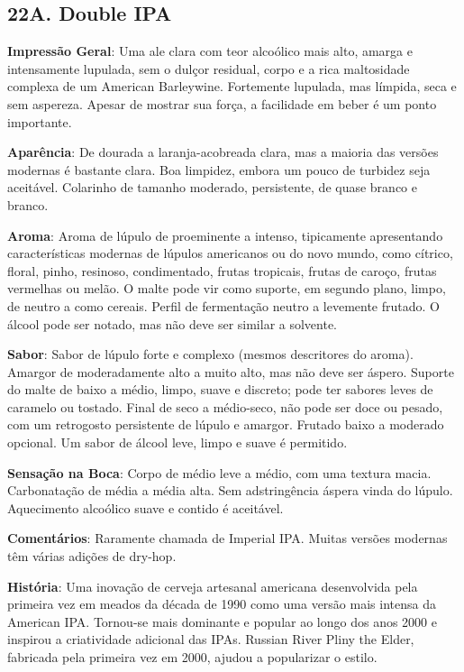 \subsection*{22A. Double IPA}
\textbf{Impressão Geral}: Uma ale clara com teor alcoólico mais alto, amarga e intensamente lupulada, sem o dulçor residual, corpo e a rica maltosidade complexa de um American Barleywine. Fortemente lupulada, mas límpida, seca e sem aspereza. Apesar de mostrar sua força, a facilidade em beber é um ponto importante.

\textbf{Aparência}: De dourada a laranja-acobreada clara, mas a maioria das versões modernas é bastante clara. Boa limpidez, embora um pouco de turbidez seja aceitável. Colarinho de tamanho moderado, persistente, de quase branco e branco.

\textbf{Aroma}: Aroma de lúpulo de proeminente a intenso, tipicamente apresentando características modernas de lúpulos americanos ou do novo mundo, como cítrico, floral, pinho, resinoso, condimentado, frutas tropicais, frutas de caroço, frutas vermelhas ou melão. O malte pode vir como suporte, em segundo plano, limpo, de neutro a como cereais. Perfil de fermentação neutro a levemente frutado. O álcool pode ser notado, mas não deve ser similar a solvente.

\textbf{Sabor}: Sabor de lúpulo forte e complexo (mesmos descritores do aroma). Amargor de moderadamente alto a muito alto, mas não deve ser áspero. Suporte do malte de baixo a médio, limpo, suave e discreto; pode ter sabores leves de caramelo ou tostado. Final de seco a médio-seco, não pode ser doce ou pesado, com um retrogosto persistente de lúpulo e amargor. Frutado baixo a moderado opcional. Um sabor de álcool leve, limpo e suave é permitido.

\textbf{Sensação na Boca}: Corpo de médio leve a médio, com uma textura macia. Carbonatação de média a média alta. Sem adstringência áspera vinda do lúpulo. Aquecimento alcoólico suave e contido é aceitável.

\textbf{Comentários}: Raramente chamada de Imperial IPA. Muitas versões modernas têm várias adições de dry-hop.

\textbf{História}: Uma inovação de cerveja artesanal americana desenvolvida pela primeira vez em meados da década de 1990 como uma versão mais intensa da American IPA. Tornou-se mais dominante e popular ao longo dos anos 2000 e inspirou a criatividade adicional das IPAs. Russian River Pliny the Elder, fabricada pela primeira vez em 2000, ajudou a popularizar o estilo.

